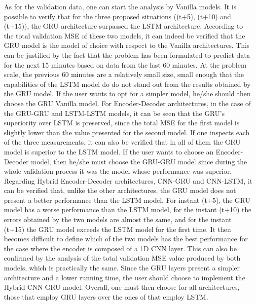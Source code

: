 As for the validation data, one can start the analysis by Vanilla models. It is possible to verify that for the three proposed situations ((t+5), (t+10) and (t+15)), the \ac{GRU} architecture surpassed the \ac{LSTM} architecture. According to the total validation \ac{MSE} of these two models, it can indeed be verified that the \ac{GRU} model is the model of choice with respect to the Vanilla architectures. This can be justified by the fact that the problem has been formulated to predict data for the next 15 minutes based on data from the last 60 minutes. At the problem scale, the previous 60 minutes are a relatively small size, small enough that the capabilities of the \ac{LSTM} model do do not stand out from the results obtained by the \ac{GRU} model. If the user wants to opt for a simpler model, he/she should then choose the \ac{GRU} Vanilla model. For Encoder-Decoder architectures, in the case of the \ac{GRU}-\ac{GRU} and \ac{LSTM}-\ac{LSTM} models, it can be seen that the \ac{GRU}'s superiority over \ac{LSTM} is preserved, since the total \ac{MSE} for the first model is slightly lower than the value presented for the second model. If one inspects each of the three measurements, it can also be verified that in all of them the \ac{GRU} model is superior to the \ac{LSTM} model. If the user wants to choose an Encoder-Decoder model, then he/she must choose the \ac{GRU}-\ac{GRU}  model since during the whole validation process it was the model whose performance was superior. Regarding Hybrid Encoder-Decoder architectures, \acs{CNN}-\ac{GRU} and \acs{CNN}-\ac{LSTM}, it can be verified that, unlike the other architectures, the \ac{GRU} model does not present a better performance than the \ac{LSTM} model. For instant (t+5), the GRU model has a worse performance than the \ac{LSTM} model, for the instant (t+10) the errors obtained by the two models are almost the same, and for the instant (t+15) the \ac{GRU} model exceeds the \ac{LSTM} model for the first time. It then becomes difficult to define which of the two models has the best performance for the case where the encoder is composed of a \ac{1D CNN} layer. This can also be confirmed by the analysis of the total validation \ac{MSE} value produced by both models, which is practically the same. Since the \ac{GRU} layers present a simpler architecture and a lower running time, the user should choose to implement the Hybrid \ac{CNN}-\ac{GRU} model. Overall, one must then choose for all architectures, those that employ \ac{GRU} layers over the ones of that employ \ac{LSTM}.

